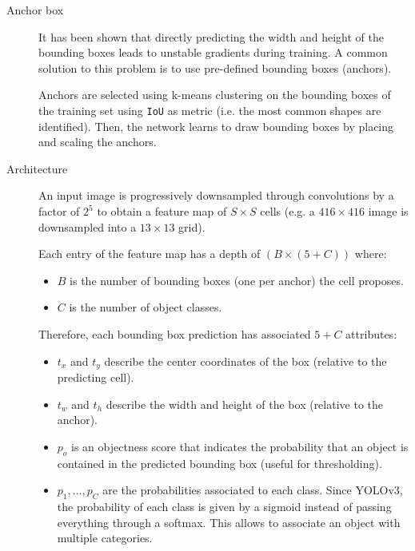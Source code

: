 \begin{description}
    \item[Anchor box] 
        It has been shown that directly predicting the width and height of the bounding boxes leads to unstable gradients during training.
        A common solution to this problem is to use pre-defined bounding boxes (anchors).

        Anchors are selected using k-means clustering on the bounding boxes of the training set using \texttt{IoU} as metric (i.e. the most common shapes are identified).
        Then, the network learns to draw bounding boxes by placing and scaling the anchors.


    \item[Architecture] 
        An input image is progressively downsampled through convolutions by a factor of $2^5$ to obtain a feature map of $S \times S$ cells
        (e.g. a $416 \times 416$ image is downsampled into a $13 \times 13$ grid).

        Each entry of the feature map has a depth of $(B \times (5+C))$ where:
        \begin{itemize}
            \item $B$ is the number of bounding boxes (one per anchor) the cell proposes.
            \item $C$ is the number of object classes.
        \end{itemize}

        Therefore, each bounding box prediction has associated $5+C$ attributes:
        \begin{itemize}
            \item $t_x$ and $t_y$ describe the center coordinates of the box (relative to the predicting cell).
            \item $t_w$ and $t_h$ describe the width and height of the box (relative to the anchor).
            \item $p_o$ is an objectness score that indicates the probability that an object is contained in the predicted bounding box (useful for thresholding).
            \item $p_1, \dots, p_C$ are the probabilities associated to each class. 
                Since YOLOv3, the probability of each class is given by a sigmoid instead of passing everything through a softmax.
                This allows to associate an object with multiple categories.
        \end{itemize}
        

\end{description}
